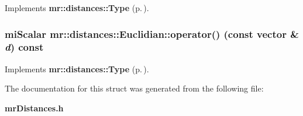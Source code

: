 Implements {\bf mr::distances::Type} {\rm (p.\,\pageref{structmr_1_1distances_1_1Type_a1})}.
\subsubsection{\setlength{\rightskip}{0pt plus 5cm}mi\-Scalar mr::distances::Euclidian::operator() (const {\bf vector} \& {\em d}) const\hspace{0.3cm}{\tt  [inline, virtual]}}\label{structmr_1_1distances_1_1Euclidian_a0}




Implements {\bf mr::distances::Type} {\rm (p.\,\pageref{structmr_1_1distances_1_1Type_a0})}.

The documentation for this struct was generated from the following file:\begin{CompactItemize}
\item 
{\bf mr\-Distances.h}\end{CompactItemize}
